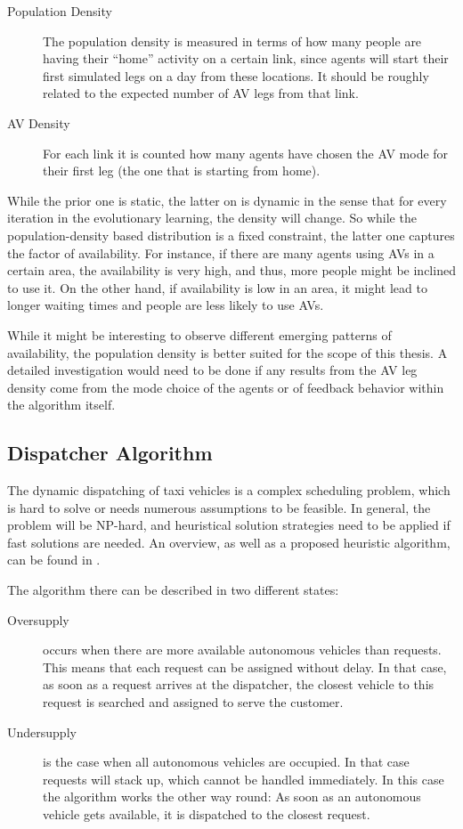 \begin{description}
\item[Population Density] The population density is measured in terms of
how many people are having their ``home'' activity on a certain link, since agents
will start their first simulated legs on a day from these locations. It should
be roughly related to the expected number of AV legs from that link.
\item[AV Density] For each link it is counted how many agents
have chosen the AV mode for their first leg (the one that is starting from home).
\end{description}

While the prior one is static, the latter on is dynamic in the sense that for every
iteration in the evolutionary learning, the density will change. So while the
population-density based distribution is a fixed constraint, the latter one captures
the factor of availability. For instance, if there are many agents using AVs in a
certain area, the availability is very high, and thus, more people might be inclined
to use it. On the other hand, if availability is low in an area, it might lead to
longer waiting times and people are less likely to use AVs.

While it might be interesting to observe different emerging patterns of availability,
the population density is better suited for the scope of this thesis. A
detailed investigation would need to be done if any results from the AV leg density
come from the mode choice of the agents or of feedback behavior within the algorithm
itself.

\subsection{Dispatcher Algorithm}

The dynamic dispatching of taxi vehicles is a complex scheduling problem,
which is hard to solve or needs numerous assumptions to be feasible. In
general, the problem will be NP-hard, and heuristical solution strategies need
to be applied if fast solutions are needed. An overview, as well as a proposed
heuristic algorithm, can be found in \citet{Maciejewski2015, Bischoff2016}.

The algorithm there can be described in two different states:

\begin{description}
\item[Oversupply] occurs when there are more available autonomous vehicles than
requests. This means that each request can be assigned without delay. In that case,
as soon as a request arrives at the dispatcher, the closest vehicle to this request
is searched and assigned to serve the customer.
\item[Undersupply] is the case when all autonomous vehicles are occupied. In that
case requests will stack up, which cannot be handled immediately. In this case the
algorithm works the other way round: As soon as an autonomous vehicle gets available,
it is dispatched to the closest request.
\end{description}


